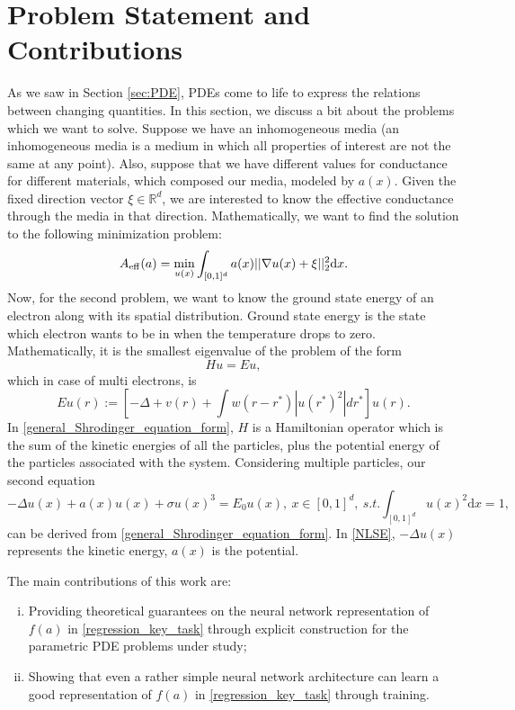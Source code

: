 \section{Problem Statement and Contributions}
As we saw in Section \eqref{sec:PDE}, PDEs come to life to express the relations between changing quantities. In this section, we discuss a bit about the problems which we want to solve.
Suppose we have an inhomogeneous media (an inhomogeneous media is a medium in which all properties of interest are not the same at any point). Also, suppose that we have different values for conductance for different materials, which composed our media, modeled by $a(x)$. Given the fixed direction vector $\xi \in \mathbb{R}^d$, we are interested to know the effective conductance through the media in that direction. Mathematically, we want to find the solution to the following minimization problem: 
\begin{equation}
A_{\operatorname{eff}}(a) = \min_{u(x)} \int_{[0,1]^d} a(x) ||\nabla u(x) + \xi||_{2}^{2} \mathrm{d}x.
\label{problem:effective_conductance}
\end{equation}
Now, for the second problem, we want to know the ground state energy of an electron along with its spatial distribution. Ground state energy is the state which electron wants to be in when the temperature drops to zero. Mathematically, it is the smallest eigenvalue of the problem of the form
\begin{equation}
\label{general_Shrodinger_equation_form}
Hu = Eu,
\end{equation}
which in case of multi electrons, is
\begin{equation}
Eu(r) := [-\Delta + v(r) + \int w(r-r^*) |u(r^*)^2|dr^*]u(r). 
\end{equation}
In \eqref{general_Shrodinger_equation_form}, $H$ is a Hamiltonian operator which is the sum of the kinetic energies of all the particles, plus the potential energy of the particles associated with the system.
Considering multiple particles, our second equation
\begin{equation}\label{NLSE}
-\Delta u(x) + a(x)u(x) + \sigma u(x)^3 = E_0 u(x), ~ x\in [0,1]^d, ~s.t. \int_{[0,1]^d}u(x)^2 \mathrm{d}x = 1,
\end{equation}
can be derived from \eqref{general_Shrodinger_equation_form}. In \eqref{NLSE}, $-\Delta u(x)$ represents the kinetic energy, $a(x)$ is the potential.

The main contributions of this work are:
\begin{enumerate}[i.]
	\item Providing theoretical guarantees on the neural network representation of $f(a)$ in \eqref{regression_key_task} through explicit construction for the parametric PDE problems under study;
	\item Showing that even a rather simple neural network architecture can learn a good representation of $f(a)$  in \eqref{regression_key_task} through training. 
\end{enumerate}

